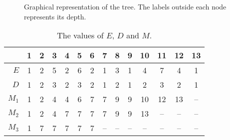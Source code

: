 \begin{enumerate}
\begin{figure}[t]
    \caption{Graphical representation of the tree. The labels outside each node
    represents its depth.}

    \label{fig:tree-depths-0}
  \end{figure}
  \begin{table}
    \centering
    \begin{tabular}{r||c|c|c|c|c|c|c|c|c|c|c|c|c|}
      \multicolumn{1}{c}{} & \multicolumn{1}{c}{\scriptsize 1} &
      \multicolumn{1}{c}{\scriptsize 2} & \multicolumn{1}{c}{\scriptsize 3} &
      \multicolumn{1}{c}{\scriptsize 4} & \multicolumn{1}{c}{\scriptsize 5} &
      \multicolumn{1}{c}{\scriptsize 6} & \multicolumn{1}{c}{\scriptsize 7} &
      \multicolumn{1}{c}{\scriptsize 8} & \multicolumn{1}{c}{\scriptsize 9} &
      \multicolumn{1}{c}{\scriptsize 10} & \multicolumn{1}{c}{\scriptsize 11} &
      \multicolumn{1}{c}{\scriptsize 12} & \multicolumn{1}{c}{\scriptsize 13} \\
      \hline
      $E$ & 1 & 2 & 5 & 2 & 6 & 2 & 1 & 3 & 1 & 4 & 7 & 4 & 1 \\\hline
      $D$ & 1 & 2 & 3 & 2 & 3 & 2 & 1 & 2 & 1 & 2 & 3 & 2 & 1 \\\hline\hline
      $M_1$ & 1 & 2 & 4 & 4 & 6 & 7 & 7 & 9 & 9 & 10 & 12 & 13 & -- \\
      $M_2$ & 1 & 2 & 4 & 7 & 7 & 7 & 7 & 9 & 9 & 13 & -- & -- & -- \\
      $M_3$ & 1 & 7 & 7 & 7 & 7 & 7 & -- & -- & -- & -- & -- & -- & -- \\
      \hline
    \end{tabular}

    \caption{The values of $E$, $D$ and $M$.}
    \label{tab:sparse-matrix}
  \end{table}

\end{enumerate}
